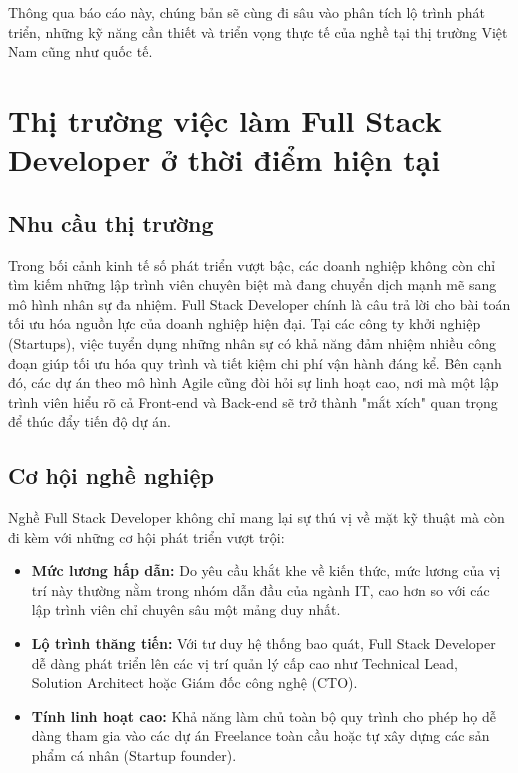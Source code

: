 \documentclass[12pt,a4paper]{article}
\begin{document}
Thông qua báo cáo này, chúng bản sẽ cùng đi sâu vào phân tích lộ trình phát triển, những kỹ năng cần thiết và triển vọng thực tế của nghề tại thị trường Việt Nam cũng như quốc tế.

\section{Thị trường việc làm Full Stack Developer ở thời điểm hiện tại}

\subsection{Nhu cầu thị trường}
\hspace{0.7cm}Trong bối cảnh kinh tế số phát triển vượt bậc, các doanh nghiệp không còn chỉ tìm kiếm những lập trình viên chuyên biệt mà đang chuyển dịch mạnh mẽ sang mô hình nhân sự đa nhiệm. Full Stack Developer chính là câu trả lời cho bài toán tối ưu hóa nguồn lực của doanh nghiệp hiện đại. Tại các công ty khởi nghiệp (Startups), việc tuyển dụng những nhân sự có khả năng đảm nhiệm nhiều công đoạn giúp tối ưu hóa quy trình và tiết kiệm chi phí vận hành đáng kể. Bên cạnh đó, các dự án theo mô hình Agile cũng đòi hỏi sự linh hoạt cao, nơi mà một lập trình viên hiểu rõ cả Front-end và Back-end sẽ trở thành "mắt xích" quan trọng để thúc đẩy tiến độ dự án.

\subsection{Cơ hội nghề nghiệp}

\hspace{0.7cm}Nghề Full Stack Developer không chỉ mang lại sự thú vị về mặt kỹ thuật mà còn đi kèm với những cơ hội phát triển vượt trội:

\begin{itemize}
    \item \textbf{Mức lương hấp dẫn:} Do yêu cầu khắt khe về kiến thức, mức lương của vị trí này thường nằm trong nhóm dẫn đầu của ngành IT, cao hơn so với các lập trình viên chỉ chuyên sâu một mảng duy nhất.
    \item \textbf{Lộ trình thăng tiến:} Với tư duy hệ thống bao quát, Full Stack Developer dễ dàng phát triển lên các vị trí quản lý cấp cao như Technical Lead, Solution Architect hoặc Giám đốc công nghệ (CTO).
    \item \textbf{Tính linh hoạt cao:} Khả năng làm chủ toàn bộ quy trình cho phép họ dễ dàng tham gia vào các dự án Freelance toàn cầu hoặc tự xây dựng các sản phẩm cá nhân (Startup founder).
\end{itemize}
\end{document}
